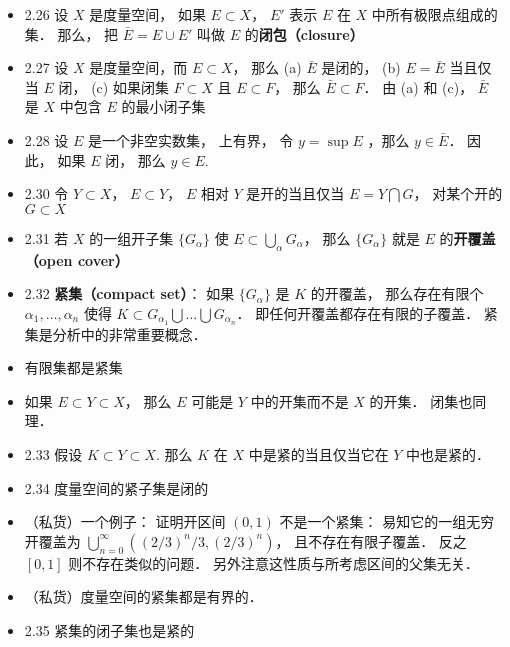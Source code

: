 \begin{itemize}
\item 2.26 设 $X$ 是度量空间， 如果 $E \subset X$， $E'$ 表示 $E$ 在 $X$ 中所有极限点组成的集． 那么， 把 $\bar E = E \cup E'$ 叫做 $E$ 的\textbf{闭包（closure）}

\item 2.27 设 $X$ 是度量空间，而 $E \subset X$， 那么 (a) $\bar E$ 是闭的， (b) $E = \bar E$ 当且仅当 $E$ 闭， (c) 如果闭集 $F \subset X$ 且 $E \subset F$， 那么 $\bar E \subset F$． 由 (a) 和 (c)， $\bar E$ 是 $X$ 中包含 $E$ 的最小闭子集

\item 2.28 设 $E$ 是一个非空实数集， 上有界， 令 $y = \sup E$ ，那么 $y \in \bar E$．
因此， 如果 $E$ 闭， 那么 $y \in E$.

\item 2.30 令 $Y \subset X$， $E \subset Y$， $E$ 相对 $Y$ 是开的当且仅当 $E = Y \bigcap G$， 对某个开的 $G \subset X$

\item 2.31 若 $X$ 的一组开子集 $\{G_\alpha\}$ 使 $E \subset \bigcup_\alpha G_\alpha$， 那么 $\{G_\alpha\}$ 就是 $E$ 的\textbf{开覆盖（open cover）}

\item 2.32 \textbf{紧集（compact set）}： 如果 $\{G_\alpha\}$ 是 $K$ 的开覆盖， 那么存在有限个 $\alpha_1,\dots, \alpha_n$ 使得 $K \subset G_{\alpha_1} \bigcup \dots \bigcup G_{\alpha_n}$． 即任何开覆盖都存在有限的子覆盖． 紧集是分析中的非常重要概念．

\item 有限集都是紧集

\item 如果 $E \subset Y \subset X$， 那么 $E$ 可能是 $Y$ 中的开集而不是 $X$ 的开集． 闭集也同理．

\item 2.33 假设 $K \subset Y \subset X$. 那么 $K$ 在 $X$ 中是紧的当且仅当它在 $Y$ 中也是紧的．

\item 2.34 度量空间的紧子集是闭的

\item （私货）一个例子： 证明开区间 $(0,1)$ 不是一个紧集： 易知它的一组无穷开覆盖为 $\bigcup_{n=0}^{\infty}((2/3)^n/3, (2/3)^n)$， 且不存在有限子覆盖． 反之 $[0,1]$ 则不存在类似的问题． 另外注意这性质与所考虑区间的父集无关．

\item （私货）度量空间的紧集都是有界的．

\item 2.35 紧集的闭子集也是紧的


\end{itemize}
